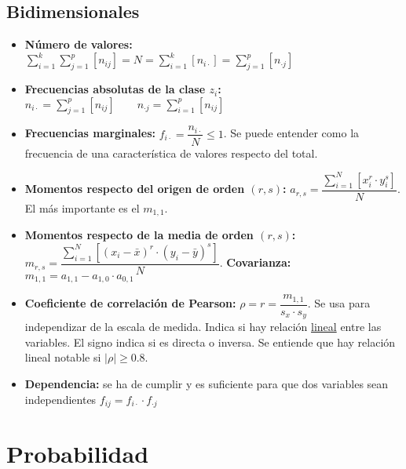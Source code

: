 \documentclass[a4paper, twocolumn, 10pt]{article}
\begin{document}
\subsection{Bidimensionales}

\begin{itemize}
	\item \textbf{Número de valores:} $\sum\limits_{i=1}^{k}\sum\limits_{j=1}^{p}[n_{ij}] = N = \sum\limits_{i=1}^{k}[n_{i\cdot}] = \sum\limits_{j=1}^{p}[n_{\cdot j}]$
	\item \textbf{Frecuencias absolutas de la clase $z_i$:} \\ $n_{i\cdot} = \sum\limits_{j=1}^p\left[n_{ij}\right] \qquad n_{\cdot j} = \sum\limits_{i=1}^p\left[n_{ij}\right]$
	\item \textbf{Frecuencias marginales:} $f_{i\cdot} = \dfrac{n_{i\cdot}}{N} \leq 1$. Se puede entender como la frecuencia de una característica de valores respecto del total. 
	\item \textbf{Momentos respecto del origen de orden $(r,s)$:} $a_{r,s} = \dfrac{\sum\limits_{i=1}^N\left[x_i^r\cdot y_i^s\right]}{N}$. El más importante es el $m_{1,1}$.
	\item \textbf{Momentos respecto de la media de orden $(r,s)$:} $m_{r,s} = \dfrac{\sum\limits_{i=1}^N\left[\left(x_i-\bar{x}\right)^r\cdot\left( y_i-\bar{y}\right)^s\right]}{N}$. \textbf{Covarianza:} $m_{1,1} = a_{1,1} - a_{1,0}\cdot a_{0,1}$
	\item \textbf{Coeficiente de correlación de Pearson:} $\rho = r = \dfrac{m_{1,1}}{s_x\cdot s_y}$. Se usa para independizar de la escala de medida. Indica si hay relación \underline{lineal} entre las variables. El signo indica si es directa o inversa. Se entiende que hay relación lineal notable si $|\rho| \geq 0.8$.
	\item \textbf{Dependencia:} se ha de cumplir y es suficiente para que dos variables sean independientes $f_{ij} = f_{i\cdot} \cdot f_{\cdot j}$
\end{itemize}

\section{Probabilidad}
\end{document}
